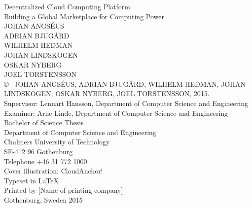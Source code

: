 \newpage
\thispagestyle{plain}
\vspace*{4.5cm}
\noindent Decentralized Cloud Computing Platform\\
Building a Global Marketplace for Computing Power\\
JOHAN ANGSÉUS\\
ADRIAN BJUGÅRD\\
WILHELM HEDMAN\\
JOHAN LINDSKOGEN\\
OSKAR NYBERG\\
JOEL TORSTENSSON\\[0.5cm]

\noindent \copyright ~ JOHAN ANGSÉUS, ADRIAN BJUGÅRD, WILHELM HEDMAN, JOHAN LINDSKOGEN, OSKAR NYBERG, JOEL TORSTENSSON, 2015.\\[0.5cm]

\noindent Supervisor: Lennart Hansson, Department of Computer Science and Engineering\\
Examiner: Arne Linde, Department of Computer Science and Engineering
\\[0.5cm]

\noindent Bachelor of Science Thesis\\
Department of Computer Science and Engineering\\
Chalmers University of Technology\\
SE-412 96 Gothenburg\\
Telephone +46 31 772 1000\\

\vfill
\noindent Cover illustration: CloudAnchor! \\

\noindent Typeset in \LaTeX \\
Printed by [Name of printing company]\\
Gothenburg, Sweden 2015

